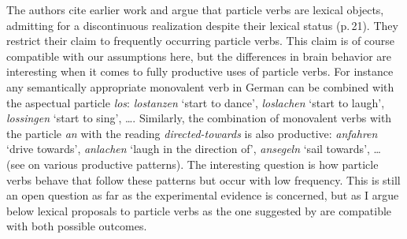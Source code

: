 \begin{exe}
\begin{xlist}[iv.]
\begin{exe}
\begin{xlist}[iv.]
\largerpage[2]
The authors cite earlier work \citep*{CSP2010a} and argue that particle verbs are lexical objects,
admitting for a discontinuous realization despite their lexical status
(p.\,21). They restrict their claim to frequently occurring particle verbs. This claim is of course
compatible with our assumptions here, but the differences in brain behavior are interesting when it
comes to fully productive uses of particle verbs. For instance any semantically appropriate monovalent verb in German can
be combined with the aspectual particle \emph{los}: \emph{lostanzen} `start to dance',
\emph{loslachen} `start to laugh', \emph{lossingen} `start to sing', \ldots. Similarly, the
combination of monovalent verbs with the particle \emph{an} with the reading \emph{directed-towards} is
also productive: \emph{anfahren} `drive towards', \emph{anlachen} `laugh in the direction of',
\emph{ansegeln} `sail towards', \ldots{} (see  on various productive
patterns). 
The interesting question is how particle verbs behave that follow these patterns but occur with low
frequency. This is still an open question as far as the experimental evidence is concerned, but as
I argue below lexical proposals to particle verbs as the one suggested by \citet{Mueller2003a} are
compatible with both possible outcomes.


\end{xlist}
\end{exe}
\end{xlist}
\end{exe}
